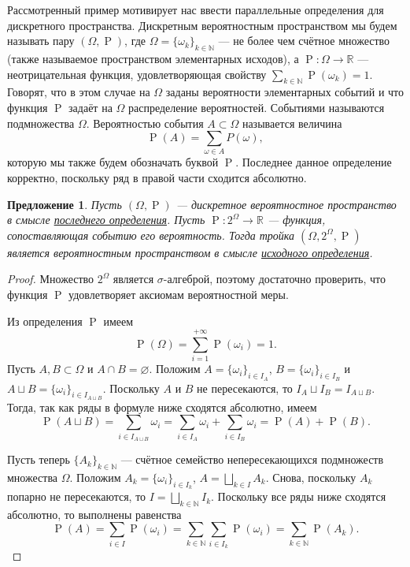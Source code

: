 \documentclass[12pt]{article}
\newtheorem{proposition}{Предложение}
\numberwithin{theorem}{section}
\numberwithin{proposition}{section}
\theoremstyle{definition}
\newcommand{\RR}{\mathbb{R}}
\newcommand{\prob}{\operatorname{P}}
\newcommand{\defin}[2]{\hypertarget{#2}{{\color{red} #1}}}
\begin{document}
	Рассмотренный пример мотивирует нас ввести параллельные определения для дискретного пространства.
	\defin{Дискретным вероятностным пространством}{discr-2} мы будем называть  пару $ (\Omega, \prob) $, 
	где $ \Omega = \{\omega_k\}_{k \in \mathbb{N}} $ --- не более чем счётное множество 
	(также называемое \defin{пространством элементарных исходов}{space-discr}),
	а $ \prob \colon \Omega \to \RR $ --- неотрицательная функция, удовлетворяющая свойству
	$ \sum\limits_{k \in \mathbb{N}} \prob(\omega_k) = 1 $.	
	Говорят, что в этом случае на $ \Omega $ \defin{заданы вероятности элементарных событий}{prob-defined} и что функция $ \prob $ 
	\defin{задаёт на $ \Omega $ распределение вероятностей}{disrtib-discr}.
	\defin{Событиями}{event-discr} называются подмножества $ \Omega $. 
	\defin{Вероятностью события}{prob-discr} $ A \subset \Omega $ называется величина
	$$ \prob(A) = \sum\limits_{\omega \in A} P(\omega), $$
	которую мы также будем обозначать буквой $ \prob $. 
	Последнее данное определение корректно, поскольку ряд в правой части сходится абсолютно.
	
	\begin{proposition} \label{}
		Пусть $ (\Omega, \prob) $ --- дискретное вероятностное пространство в смысле \hyperlink{discr-2}{последнего определения}.
		Пусть $ \prob \colon 2^{\Omega} \to \mathbb{R} $ --- функция, сопоставляющая событию его вероятность.
		Тогда тройка $ (\Omega, 2^{\Omega}, \prob) $ является вероятностным пространством в смысле \hyperlink{prob-space}{исходного определения}.
	\end{proposition}
	
	\begin{proof}
		
		Множество $ 2^{\Omega} $ является $ \sigma $-алгеброй, поэтому достаточно проверить, что функция $ \prob $
		удовлетворяет аксиомам вероятностной меры.
		
		Из определения $ \prob $ имеем
		$$ \prob(\Omega) = \sum\limits_{i = 1}^{+\infty} \prob(\omega_i) = 1. $$
		Пусть $ A, B \subset \Omega $ и $ A \cap B = \varnothing $.
		Положим $ A = \{\omega_{i}\}_{i \in I_A} $, $ B = \{\omega_{i}\}_{i \in I_B} $ и 
		$ A \sqcup B = \{\omega_i\}_{i \in I_{A \sqcup B}} $. 
		Поскольку $ A $ и $ B $ не пересекаются, то $ I_A \sqcup I_B =  I_{A \sqcup B} $.
		Тогда, так как ряды в формуле ниже сходятся абсолютно, имеем
		$$ \prob(A \sqcup B) = \sum\limits_{i \in I_{A \sqcup B}} \omega_i = 
		\sum\limits_{i \in I_A} \omega_{i} + \sum\limits_{i \in I_B} \omega_{i}
		= \prob(A) + \prob(B). $$
		
		Пусть теперь $ \{A_k\}_{k \in \mathbb{N}} $ --- счётное семейство непересекающихся подмножеств множества $ \Omega $.
		Положим $ A_k = \{\omega_{i}\}_{i \in I_k} $, $ A = \bigsqcup\limits_{k \in I} A_k $.
		Снова, поскольку $ A_k $ попарно не пересекаются, то $ I = \bigsqcup\limits_{k \in \mathbb{N}} I_k $.
		Поскольку все ряды ниже сходятся абсолютно, то выполнены равенства
		$$ \prob(A) = \sum\limits_{i \in I} \prob(\omega_i) 
		= \sum\limits_{k \in \mathbb{N}} \sum\limits_{i \in I_k} \prob(\omega_i) 
		= \sum\limits_{k \in \mathbb{N}} \prob(A_k). $$
	\end{proof}
	
\end{document}
